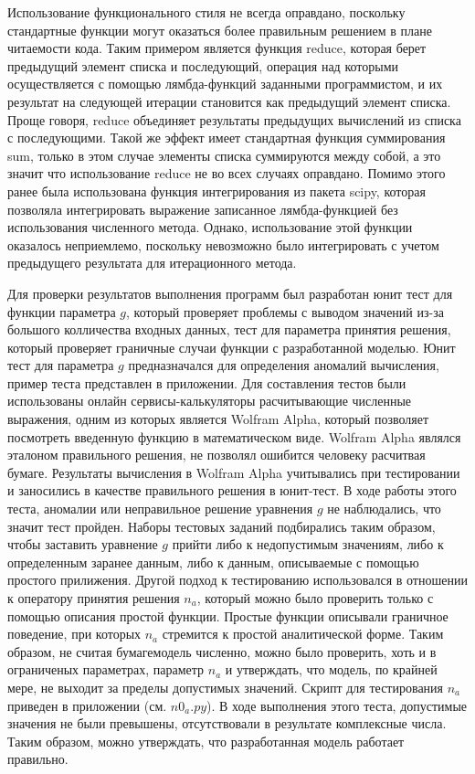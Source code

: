 Использование функционального стиля не всегда оправдано, поскольку стандартные функции могут оказаться
более правильным решением в плане читаемости кода.
Таким примером является функция reduce, которая берет предыдущий элемент списка и последующий, операция
над которыми осуществляется с помощью лямбда-функций заданными программистом, и их результат на следующей
итерации становится как предыдущий элемент списка.
Проще говоря, reduce объединяет результаты предыдущих вычислений из списка с последующими.
Такой же эффект имеет стандартная функция суммирования sum, только в этом случае элементы списка суммируются
между собой, а это значит что использование reduce не во всех случаях оправдано.
Помимо этого ранее была использована функция интегрирования из пакета scipy, которая позволяла интегрировать
выражение записанное лямбда-функцией без использования численного метода.
Однако, использование этой функции оказалось неприемлемо, поскольку невозможно было интегрировать с учетом
предыдущего результата для итерационного метода.

Для проверки результатов выполнения программ был разработан юнит тест для функции параметра $g$, который
проверяет проблемы с выводом значений из-за большого колличества входных данных, тест для параметра принятия
решения, который проверяет граничные случаи функции с разработанной моделью.
Юнит тест для параметра $g$ предназначался для определения аномалий вычисления, пример теста представлен в приложении.
Для составления тестов были использованы онлайн сервисы-калькуляторы расчитывающие численные выражения,
одним из которых является Wolfram Alpha, который позволяет посмотреть введенную функцию в математическом виде.
Wolfram Alpha являлся эталоном правильного решения, не позволял ошибится человеку расчитвая  бумаге\grqq.
Результаты вычисления в Wolfram Alpha учитывались при тестировании и заносились в качестве правильного решения в юнит-тест.
В ходе работы этого теста, аномалии или неправильное решение уравнения $g$ не наблюдались, что значит
тест пройден.
Наборы тестовых заданий подбирались таким образом, чтобы заставить уравнение $g$ прийти либо к недопустимым
значениям, либо к определенным заранее данным, либо к данным, описываемые с помощью простого прилижения.
Другой подход к тестированию использовался в отношении к оператору принятия решения $n_{a}$, который
можно было проверить только с помощью описания простой функции.
Простые функции описывали граничное поведение, при которых $n_{a}$ стремится к простой аналитической форме.
Таким образом, не считая  бумаге\grqq модель численно, можно было проверить, хоть и в ограниченых параметрах,
параметр $n_{a}$ и утверждать, что модель, по крайней мере, не выходит за пределы допустимых значений.
Скрипт для тестирования $n_{a}$ приведен в приложении (см. $n0_a.py$).
В ходе выполнения этого теста, допустимые значения не были превышены, отсутствовали в результате комплексные числа.
Таким образом, можно утверждать, что разработанная модель работает правильно.